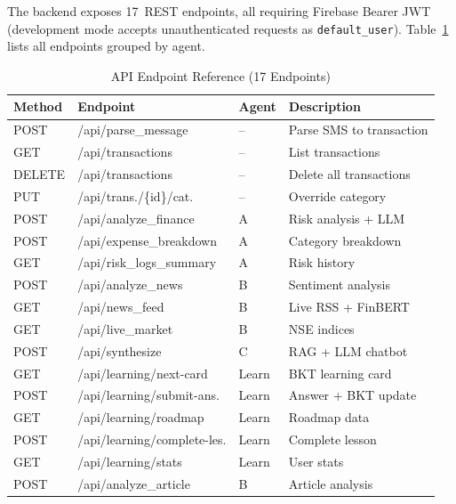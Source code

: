 \documentclass[conference]{IEEEtran}
\begin{document}
The backend exposes 17~REST endpoints, all requiring Firebase Bearer JWT (development mode accepts unauthenticated requests as \texttt{default\_user}). Table~\ref{tab:api} lists all endpoints grouped by agent.

\begin{table}[!t]
\centering
\caption{API Endpoint Reference (17 Endpoints)}
\label{tab:api}
\renewcommand{\arraystretch}{1.1}
\scriptsize
\begin{tabular}{l l l p{2.5cm}}
\toprule
\textbf{Method} & \textbf{Endpoint} & \textbf{Agent} & \textbf{Description} \\
\midrule
POST   & /api/parse\_message        & --    & Parse SMS to transaction \\
GET    & /api/transactions          & --    & List transactions \\
DELETE & /api/transactions          & --    & Delete all transactions \\
PUT    & /api/trans./\{id\}/cat.    & --    & Override category \\
POST   & /api/analyze\_finance      & A     & Risk analysis + LLM \\
POST   & /api/expense\_breakdown    & A     & Category breakdown \\
GET    & /api/risk\_logs\_summary    & A     & Risk history \\
POST   & /api/analyze\_news         & B     & Sentiment analysis \\
GET    & /api/news\_feed            & B     & Live RSS + FinBERT \\
GET    & /api/live\_market          & B     & NSE indices \\
POST   & /api/synthesize            & C     & RAG + LLM chatbot \\
GET    & /api/learning/next-card    & Learn & BKT learning card \\
POST   & /api/learning/submit-ans.  & Learn & Answer + BKT update \\
GET    & /api/learning/roadmap      & Learn & Roadmap data \\
POST   & /api/learning/complete-les.& Learn & Complete lesson \\
GET    & /api/learning/stats        & Learn & User stats \\
POST   & /api/analyze\_article      & B     & Article analysis \\
\bottomrule
\end{tabular}
\end{table}
\end{document}
